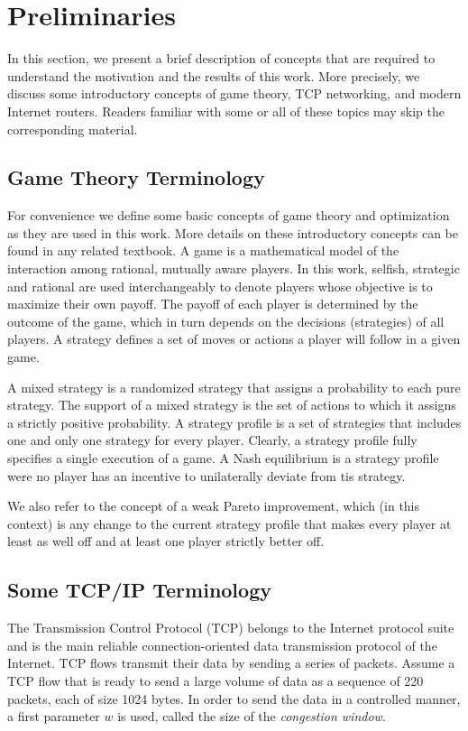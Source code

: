 \documentclass[letterpaper,10pt]{llncs}
\newcommand{\hla}[1]{\hl{#1}}
\renewcommand{\hla}[1]{#1}
\begin{document}
\section{Preliminaries}
\label{sec:prelim}

In this section, we present a brief description of concepts that 
are required to understand the motivation and the results of this work.
More precisely, we discuss some introductory concepts of game theory, 
TCP networking, and modern Internet routers.
Readers familiar with some or all of these topics may skip the 
corresponding material.

\subsection{Game Theory Terminology}

\hla{
For convenience we define some basic concepts of game theory and optimization
as they are used in this work. More details on these introductory concepts can be found
in any related textbook.
A game is a mathematical model of the interaction among rational, mutually aware players.
In this work, selfish, strategic and rational are used interchangeably to denote players
whose objective is to maximize their own payoff.
The payoff of each player is determined by the outcome of the game, which in turn depends
on the decisions (strategies) of all players.
A strategy defines a set of moves or actions a player will follow in a given game.}

\hla{A mixed strategy is a randomized strategy that assigns a probability to each pure
strategy. The support of a mixed strategy is the set of actions to which it assigns a
strictly positive probability. 
A strategy profile is a set of strategies that includes one and only one strategy for every player.
Clearly, a strategy profile fully specifies a single execution of a game.
A Nash equilibrium is a strategy profile were no player has an incentive to unilaterally 
deviate from tis strategy.
}

\hla{
We also refer to the concept of a weak Pareto improvement, which (in this context) is
any change to the current strategy profile that makes every player at least as well off 
and at least one player strictly better off.
}

\subsection{Some TCP/IP Terminology}
\label{sec:tcp}
The Transmission Control Protocol (TCP) belongs to the Internet protocol suite and is the main reliable connection-oriented data transmission
protocol of the Internet. TCP flows transmit their data by sending a series of packets. Assume a TCP flow that is ready to send
a large volume of data as a sequence of 220 packets, each of size 1024 bytes. 
In order to send the data in a controlled manner, a first parameter $w$ is used,  called the size of the \emph{congestion window}.
\end{document}
